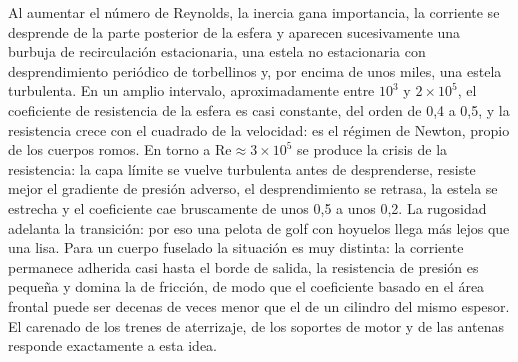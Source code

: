 \documentclass[10pt,openany]{book}
\begin{document}
Al aumentar el número de Reynolds, la inercia gana importancia, la corriente se desprende de la parte posterior de la esfera y aparecen sucesivamente una burbuja de recirculación estacionaria, una estela no estacionaria con desprendimiento periódico de torbellinos y, por encima de unos miles, una estela turbulenta. En un amplio intervalo, aproximadamente entre \(10^{3}\) y \(2\times 10^{5}\), el coeficiente de resistencia de la esfera es casi constante, del orden de 0,4 a 0,5, y la resistencia crece con el cuadrado de la velocidad: es el régimen de Newton, propio de los cuerpos romos. En torno a \(\mathrm{Re} \approx 3\times 10^{5}\) se produce la crisis de la resistencia: la capa límite se vuelve turbulenta antes de desprenderse, resiste mejor el gradiente de presión adverso, el desprendimiento se retrasa, la estela se estrecha y el coeficiente cae bruscamente de unos 0,5 a unos 0,2. La rugosidad adelanta la transición: por eso una pelota de golf con hoyuelos llega más lejos que una lisa. Para un cuerpo fuselado la situación es muy distinta: la corriente permanece adherida casi hasta el borde de salida, la resistencia de presión es pequeña y domina la de fricción, de modo que el coeficiente basado en el área frontal puede ser decenas de veces menor que el de un cilindro del mismo espesor. El carenado de los trenes de aterrizaje, de los soportes de motor y de las antenas responde exactamente a esta idea.
\end{document}
